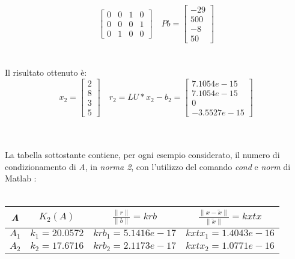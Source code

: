 \begin{description}
\[\begin{bmatrix}
			0 & 0 & 1 & 0 \\
			0 & 0 & 0 & 1 \\
			0 & 1 & 0 & 0 
		\end{bmatrix} \quad
		Pb =\begin{bmatrix}
			-29 \\
			500 \\
			-8  \\
			50               
		\end{bmatrix}
		\]\\\\
	Il risultato ottenuto è:\\
		\[
		x_2 =\begin{bmatrix}
			2 \\
		  	8 \\
		  	3 \\
		  	5 
		\end{bmatrix} \quad
		r_2 = LU*x_2-b_2 =\begin{bmatrix}
			7.1054e-15 \\
		  	7.1054e-15 \\
		  	0 \\
		  	-3.5527e-15 
		\end{bmatrix}
		\]\\\\
\end{description}
La tabella sottostante contiene, per ogni esempio considerato, il numero di condizionamento di \textit{A}, in \textit{norma 2}, con l'utilizzo del comando \textit{cond} e \textit{norm} di Matlab :\\\
\begin{center}
	\begin{tabular}{ | c | c | c | c | }
		\hline
			\textit{A} & $K_2(A)$ & $\frac{\|r\|}{\|b\|}=krb$ & $\frac{\|x-\tilde{x}\|}{\|\tilde{x}\|}=kxtx$ \\
		\hline
			$A_1$ & $k_1=20.0572$ & $krb_1=5.1416e-17$ & $kxtx_1=1.4043e-16$ \\
			$A_2$ &	$k_2=17.6716$ & $krb_2=2.1173e-17$ & $kxtx_2=1.0771e-16$ \\
		\hline
	\end{tabular}
\end{center}